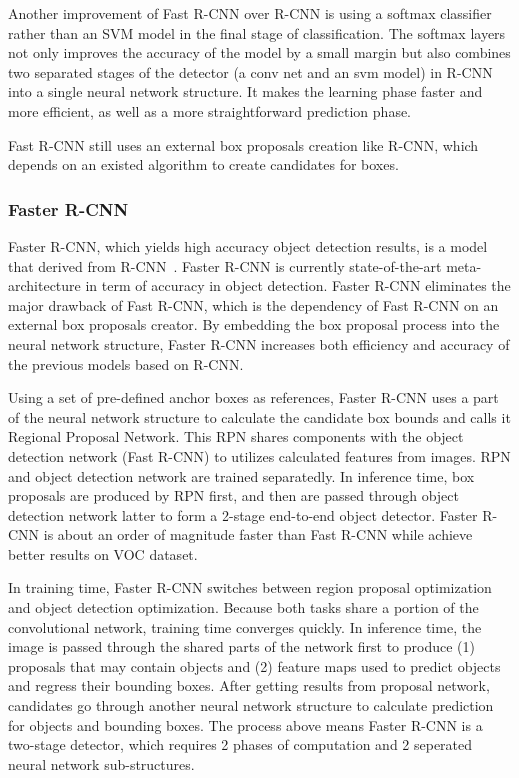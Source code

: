 \documentclass[conference]{IEEEtran}
\begin{document}
Another improvement of Fast R-CNN over R-CNN is using a softmax classifier rather than an SVM model in the final stage of classification. The softmax layers not only improves the accuracy of the model by a small margin but also combines two separated stages of the detector (a conv net and an svm model) in R-CNN into a single neural network structure. It makes the learning phase faster and more efficient, as well as a more straightforward prediction phase. 

Fast R-CNN still uses an external box proposals creation like R-CNN, which depends on an existed algorithm to create candidates for boxes. 

\subsubsection{Faster R-CNN}
Faster R-CNN, which yields high accuracy object detection results, is a model that derived from R-CNN~\cite{girshick2015fast}. Faster R-CNN is currently state-of-the-art meta-architecture in term of accuracy in object detection. Faster R-CNN eliminates the major drawback of Fast R-CNN, which is the dependency of Fast R-CNN on an external box proposals creator. By embedding the box proposal process into the neural network structure, Faster R-CNN increases both efficiency and accuracy of the previous models based on R-CNN.

Using a set of pre-defined anchor boxes as references, Faster R-CNN uses a part of the neural network structure to calculate the candidate box bounds and calls it Regional Proposal Network. This RPN shares components with the object detection network (Fast R-CNN) to utilizes calculated features from images. RPN and object detection network are trained separatedly. In inference time, box proposals are produced by RPN first, and then are passed through object detection network latter to form a 2-stage end-to-end object detector. Faster R-CNN is about an order of magnitude faster than Fast R-CNN while achieve better results on VOC dataset.

In training time, Faster R-CNN switches between region proposal optimization and object detection optimization. Because both tasks share a portion of the convolutional network, training time converges quickly. In inference time, the image is passed through the shared parts of the network first to produce (1) proposals that may contain objects and (2) feature maps used to predict objects and regress their bounding boxes. After getting results from proposal network, candidates go through another neural network structure to calculate prediction for objects and bounding boxes. The process above means Faster R-CNN is a two-stage detector, which requires 2 phases of computation and 2 seperated neural network sub-structures. 
\end{document}

